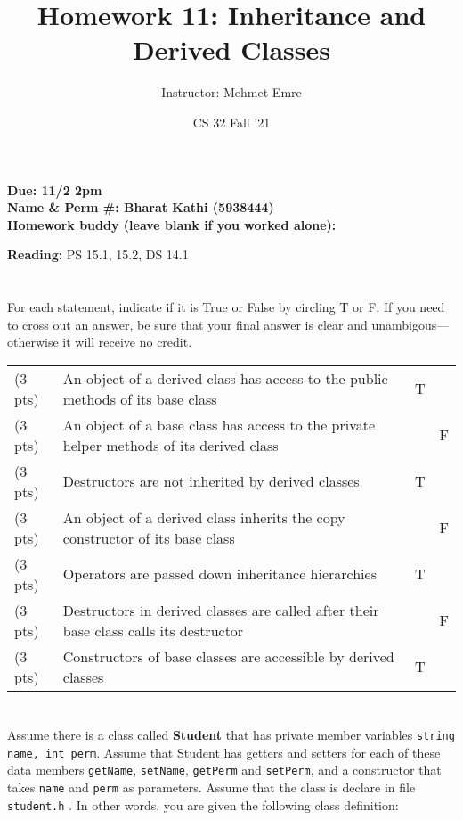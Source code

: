 \documentclass[11pt]{article}
\author{Instructor: Mehmet Emre}
\date{CS 32 Fall '21}
\title{Homework 11: Inheritance and Derived Classes}
\begin{document}
\maketitle
\textbf{Due: 11/2 2pm} \\ 
\vspace{1em}
\textbf{Name \& Perm \#: Bharat Kathi (5938444)} \\ 
\textbf{Homework buddy (leave blank if you worked alone):}

\textbf{Reading:} PS 15.1, 15.2, DS 14.1

\section{}
\label{sec:orgf1389b4}

For each statement, indicate if it is True or False by circling T or F.
If you need to cross out an answer, be sure that your final answer is
clear and unambigous---otherwise it will receive no credit.

\begin{center}
\begin{tabular}{llll}
(3 pts) & An object of a derived class has access to the public methods of its base class & T & \\
(3 pts) & An object of a base class has access to the private helper methods of its derived class &  & F\\
(3 pts) & Destructors are not inherited by derived classes & T & \\
(3 pts) & An object of a derived class inherits the copy constructor of its base class &  & F\\
(3 pts) & Operators are passed down inheritance hierarchies & T & \\
(3 pts) & Destructors in derived classes are called after their base class calls its destructor &  & F\\
(3 pts) & Constructors of base classes are accessible by derived classes & T & \\
\end{tabular}
\end{center}

\section{}
\label{sec:org15ab71b}

Assume there is a class called \textbf{Student} that has private member variables
\texttt{string name, int perm}. Assume that Student has getters and setters for each of
these data members \texttt{getName}, \texttt{setName}, \texttt{getPerm} and \texttt{setPerm}, and a
constructor that takes \texttt{name} and \texttt{perm} as parameters.  Assume that the class
is declare in file \texttt{student.h} . In other words, you are given the following
class definition:
\end{document}
